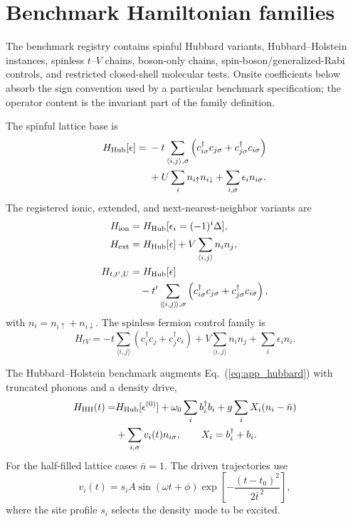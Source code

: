 \documentclass[
  reprint,
  amsmath,
  amssymb,
  aps,
  pra,
  nofootinbib,
  superscriptaddress,
  floatfix
]{revtex4-2}
\newcommand{\hh}{\mathrm{HH}}
\begin{document}
\clearpage
\appendix

\section{Benchmark Hamiltonian families}
\label{app:hamiltonian_families}

The benchmark registry contains spinful Hubbard variants, Hubbard--Holstein instances, spinless $t$--$V$ chains, boson-only chains, spin-boson/generalized-Rabi controls, and restricted closed-shell molecular tests. Onsite coefficients below absorb the sign convention used by a particular benchmark specification; the operator content is the invariant part of the family definition.

The spinful lattice base is
\begin{align}
H_{\rm Hub}[\epsilon]={}&
-t\sum_{\langle i,j\rangle,\sigma}
\left(c_{i\sigma}^{\dagger}c_{j\sigma}
+c_{j\sigma}^{\dagger}c_{i\sigma}\right)
\nonumber\\
&
+U\sum_i n_{i\uparrow}n_{i\downarrow}
+\sum_{i,\sigma}\epsilon_i n_{i\sigma}.
\label{eq:app_hubbard}
\end{align}
The registered ionic, extended, and next-nearest-neighbor variants are
\begin{align}
H_{\rm ion}&=H_{\rm Hub}[\epsilon_i=(-1)^i\Delta],
\nonumber\\
H_{\rm ext}&=H_{\rm Hub}[\epsilon]+V\sum_{\langle i,j\rangle} n_i n_j,
\nonumber\\
H_{t,t',U}&=H_{\rm Hub}[\epsilon]
\nonumber\\
&\quad
-t'\sum_{\langle\!\langle i,j\rangle\!\rangle,\sigma}
\left(c_{i\sigma}^{\dagger}c_{j\sigma}
+c_{j\sigma}^{\dagger}c_{i\sigma}\right),
\label{eq:app_hubbard_variants}
\end{align}
with $n_i=n_{i\uparrow}+n_{i\downarrow}$. The spinless fermion control family is
\begin{equation}
H_{tV}=
-t\sum_{\langle i,j\rangle}
\left(c_i^\dagger c_j+c_j^\dagger c_i\right)
+V\sum_{\langle i,j\rangle}n_i n_j
+\sum_i\epsilon_i n_i .
\label{eq:app_spinless_tv}
\end{equation}

The Hubbard--Holstein benchmark augments Eq.~(\ref{eq:app_hubbard}) with truncated phonons and a density drive,
\begin{align}
H_{\hh}(t)=&H_{\rm Hub}[\epsilon^{(0)}]
+\omega_0\sum_i b_i^{\dagger}b_i
+g\sum_i X_i(n_i-\bar n)
\nonumber\\
&+\sum_{i,\sigma}v_i(t)n_{i\sigma},
\qquad
X_i=b_i^\dagger+b_i .
\label{eq:app_hh}
\end{align}
For the half-filled lattice cases $\bar n=1$. The driven trajectories use
\begin{equation}
v_i(t)=s_i A\sin(\omega t+\phi)
\exp\left[-\frac{(t-t_0)^2}{2\bar t^{\,2}}\right],
\label{eq:app_drive_waveform}
\end{equation}
where the site profile $s_i$ selects the density mode to be excited.
\end{document}

